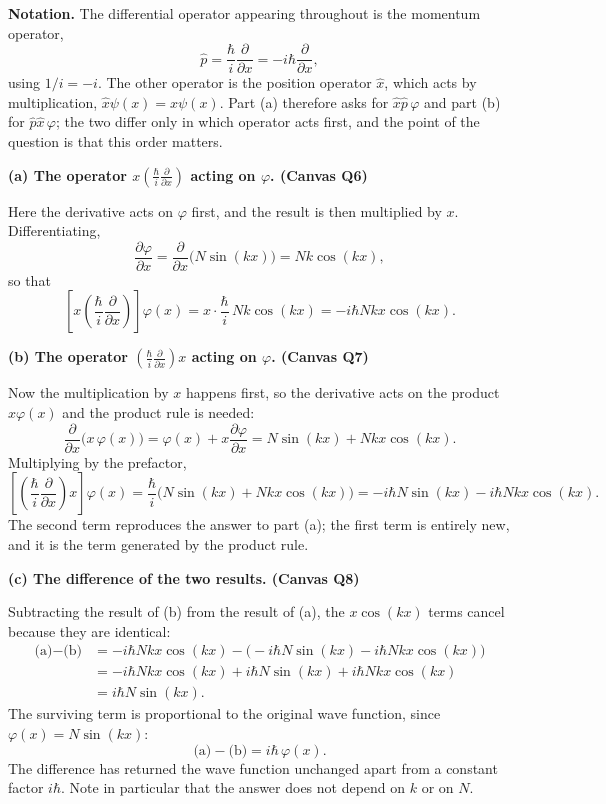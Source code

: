 \documentclass[12pt]{article}
\newif\ifsolutions
\newcommand{\problemsep}{\vspace{0.8em}}
\begin{document}
\ifsolutions
\begin{solutionbox}

\textbf{Notation.} The differential operator appearing throughout is the momentum operator,
\[
    \hat{p}=\frac{\hbar}{i}\frac{\partial}{\partial x}=-i\hbar\frac{\partial}{\partial x},
\]
using $1/i=-i$. The other operator is the position operator $\hat{x}$, which acts by multiplication, $\hat{x}\psi(x)=x\psi(x)$. Part (a) therefore asks for $\hat{x}\hat{p}\,\varphi$ and part (b) for $\hat{p}\hat{x}\,\varphi$; the two differ only in which operator acts first, and the point of the question is that this order matters.

\problemsep
\textbf{(a) The operator $x\left(\frac{\hbar}{i}\frac{\partial}{\partial x}\right)$ acting on $\varphi$. \hfill (Canvas Q6)}

Here the derivative acts on $\varphi$ first, and the result is then multiplied by $x$. Differentiating,
\[
    \frac{\partial \varphi}{\partial x}
    =\frac{\partial}{\partial x}\Big(N\sin(kx)\Big)
    =Nk\cos(kx),
\]
so that
\[
    \left[x\left(\frac{\hbar}{i}\frac{\partial}{\partial x}\right)\right]\varphi(x)
    =x\cdot\frac{\hbar}{i}\,Nk\cos(kx)
    =-i\hbar Nkx\cos(kx).
\]

\problemsep
\textbf{(b) The operator $\left(\frac{\hbar}{i}\frac{\partial}{\partial x}\right)x$ acting on $\varphi$. \hfill (Canvas Q7)}

Now the multiplication by $x$ happens first, so the derivative acts on the product $x\varphi(x)$ and the product rule is needed:
\[
    \frac{\partial}{\partial x}\Big(x\,\varphi(x)\Big)
    =\varphi(x)+x\frac{\partial \varphi}{\partial x}
    =N\sin(kx)+Nkx\cos(kx).
\]
Multiplying by the prefactor,
\[
    \left[\left(\frac{\hbar}{i}\frac{\partial}{\partial x}\right)x\right]\varphi(x)
    =\frac{\hbar}{i}\Big(N\sin(kx)+Nkx\cos(kx)\Big)
    =-i\hbar N\sin(kx)-i\hbar Nkx\cos(kx).
\]
The second term reproduces the answer to part (a); the first term is entirely new, and it is the term generated by the product rule.

\problemsep
\textbf{(c) The difference of the two results. \hfill (Canvas Q8)}

Subtracting the result of (b) from the result of (a), the $x\cos(kx)$ terms cancel because they are identical:
\begin{align*}
    \text{(a)}-\text{(b)}
    &=-i\hbar Nkx\cos(kx)-\Big(-i\hbar N\sin(kx)-i\hbar Nkx\cos(kx)\Big)\\
    &=-i\hbar Nkx\cos(kx)+i\hbar N\sin(kx)+i\hbar Nkx\cos(kx)\\
    &=i\hbar N\sin(kx).
\end{align*}
The surviving term is proportional to the original wave function, since $\varphi(x)=N\sin(kx)$:
\[
    \text{(a)}-\text{(b)}=i\hbar\,\varphi(x).
\]
The difference has returned the wave function unchanged apart from a constant factor $i\hbar$. Note in particular that the answer does not depend on $k$ or on $N$.


\end{solutionbox}
\end{document}
